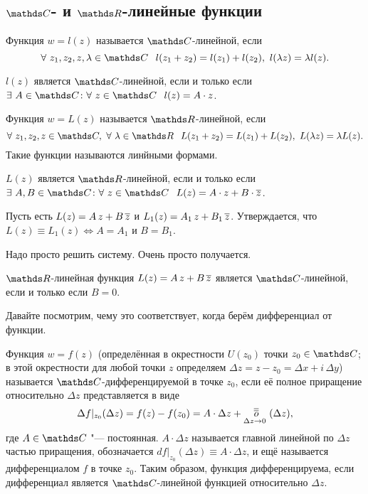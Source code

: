 \subsection{$\C$- и $\R$-линейные функции}
\begin{Def}
	Функция $w = l(z)$ называется $\C$-линейной, если
	\[
		\forall\ z_1,z_2,z,\lambda\in \C\pau l(z_1+z_2) = l(z_1) + l(z_2),\ l(\lambda z) = \lambda l(z).
	\]
\end{Def}
\begin{Task}
	$l(z)$ является $\C$-линейной, если и только если $\exists\ A\in\C\colon \forall\ z\in\C\pau l(z) = A\cdot z$.
\end{Task}
\begin{Def}
	Функция $w = L(z)$ называется $\R$-линейной, если
	\[
		\forall\ z_1,z_2,z\in\C,\ \forall\ \lambda\in\R\pau L(z_1+z_2) = L(z_1) + L(z_2),\ L(\lambda z) = \lambda L(z).
	\]
	Такие функции называются линйными формами.
\end{Def}
\begin{Task}
	$L(z)$ является $\R$-линейной, если и только если $\exists\ A,B\in\C\colon \forall\ z\in\C\pau L(z) = A\cdot z+B\cdot \ol z$.
\end{Task}
\begin{Task}
	Пусть есть $L(z) = A\,z+ B\,\ol z$ и $L_1(z) = A_1\,z+B_1\,\ol z$. Утверждается, что $L(z)\equiv L_1(z)\iff A = A_1$ и $B= B_1$.
\end{Task}
Надо просто решить систему. Очень просто получается.

\begin{Sl}
	$\R$-линейная функция $L(z) = A\,z + B\,\ol z$ является $\C$-линейной, если и только если $B=0$.
\end{Sl}
Давайте посмотрим, чему это соответствует, когда берём дифференциал от функции.

\begin{Def}
	Функция $w = f(z)$ (определённая в окрестности $U(z_0)$ точки $z_0\in\C$; в этой окрестности для любой точки $z$ определяем $\Delta z = z -z_0 = \Delta x + i\,\Delta y$) называется $\C$-дифференцируемой в точке $z_0$, если её полное приращение относительно $\Delta z$ представляется в виде
	\[
		\Delta f|_{z_0}(\Delta z)= f(z) - f(z_0) = A\cdot \Delta z + \ooo{\Delta z}{\Delta z\to0},
	\]
	где $A\in\C$ "--- постоянная. $A\cdot \Delta z$ называется главной линейной по $\Delta z$ частью приращения, обозначается $df|_{z_0}(\Delta z)\equiv A\cdot\Delta z$, и ещё называется дифференциалом $f$ в точке $z_0$. Таким образом, функция дифференцируема, если дифференциал является $\C$-линейной функцией относительно $\Delta z$.
\end{Def}

